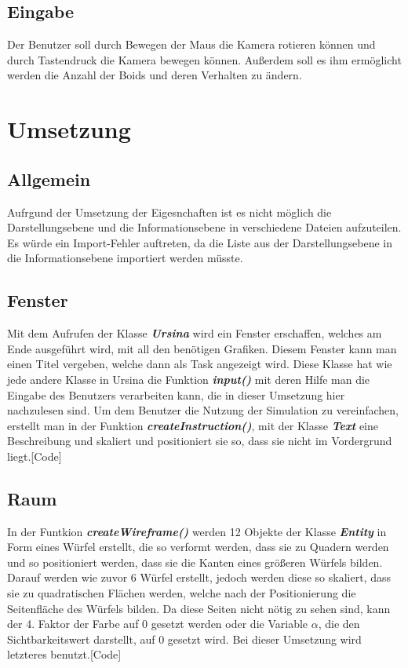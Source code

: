 \documentclass[a4paper, 12pt]{article}
\begin{document}
	\subsection{Eingabe}
	Der Benutzer soll durch Bewegen der Maus die Kamera rotieren können und durch Tastendruck die Kamera bewegen können. Außerdem soll es ihm ermöglicht werden die Anzahl der Boids und deren Verhalten zu ändern.
	\newpage
	
	
	
	\section{Umsetzung}
	\subsection{Allgemein}
	Aufrgund der Umsetzung der Eigesnchaften ist es nicht möglich die Darstellungsebene und die Informationsebene in verschiedene Dateien aufzuteilen. Es würde ein Import-Fehler auftreten, da die Liste aus der Darstellungsebene in die Informationsebene importiert werden müsste.
	
	\subsection{Fenster}
	Mit dem Aufrufen der Klasse \textbf{\emph{Ursina}} wird ein Fenster erschaffen, welches am Ende ausgeführt wird, mit all den benötigen Grafiken. Diesem Fenster kann man einen Titel vergeben, welche dann als Task angezeigt wird. Diese Klasse hat wie jede andere Klasse in Ursina die Funktion \textbf{\emph{input()}} mit deren Hilfe man die Eingabe des Benutzers verarbeiten kann, die in dieser Umsetzung hier nachzulesen sind. Um dem Benutzer die Nutzung der Simulation zu vereinfachen, erstellt man in der Funktion \textbf{\emph{createInstruction()}}, mit der Klasse \textbf{\emph{Text}} eine Beschreibung und skaliert und positioniert sie so, dass sie nicht im Vordergrund liegt.[Code]
	\subsection{Raum}
	In der Funtkion \textbf{\emph{createWireframe()}} werden 12 Objekte der Klasse \emph{\textbf{Entity}} in Form eines Würfel erstellt, die so verformt werden, dass sie zu Quadern werden und so positioniert werden, dass sie die Kanten eines größeren Würfels bilden. Darauf werden wie zuvor 6 Würfel erstellt, jedoch werden diese so skaliert, dass sie zu quadratischen Flächen werden, welche nach der Positionierung die Seitenfläche des Würfels bilden. Da diese Seiten nicht nötig zu sehen sind, kann der 4. Faktor der Farbe auf 0 gesetzt werden oder die Variable $\alpha$, die den Sichtbarkeitswert darstellt, auf 0 gesetzt wird. Bei dieser Umsetzung wird letzteres benutzt.[Code]
	
\end{document}
